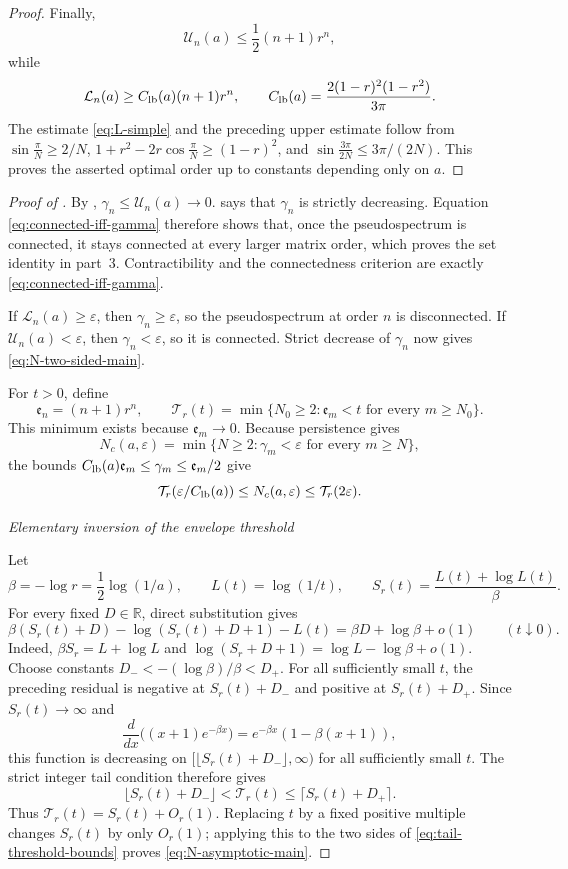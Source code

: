 \documentclass[11pt,a4paper]{article}
\numberwithin{equation}{section}
\newcommand{\proofstage}[1]{%
  \par\medskip\noindent\textit{#1}\par\nobreak\smallskip}
\begin{document}
\begin{proof}
Finally,
\[
 \mathcal U_n(a)\leq\frac12(n+1)r^n,
\]
while
\begin{equation}\label{eq:L-simple}
 \mathcal L_n(a)\geq C_{\rm lb}(a)(n+1)r^n,\qquad
 C_{\rm lb}(a)=\frac{2(1-r)^2(1-r^2)}{3\pi}.
\end{equation}
The estimate \eqref{eq:L-simple} and the preceding upper estimate follow from
\(\sin\frac{\pi}{N}\geq2/N\),
\(1+r^2-2r\cos\frac{\pi}{N}\geq(1-r)^2\), and
\(\sin\frac{3\pi}{2N}\leq3\pi/(2N)\).  This proves the asserted optimal
order up to constants depending only on \(a\).
\end{proof}

\begin{proof}[Proof of ]
By ,
\(\gamma_n\leq\mathcal U_n(a)\to0\).   says that
\(\gamma_n\) is strictly decreasing.  Equation
\eqref{eq:connected-iff-gamma} therefore shows that, once the
pseudospectrum is connected, it stays connected at every larger matrix
order, which proves the set identity in part~3.  Contractibility and the
connectedness criterion are exactly \eqref{eq:connected-iff-gamma}.

If \(\mathcal L_n(a)\geq\varepsilon\), then
\(\gamma_n\geq\varepsilon\), so the pseudospectrum at order \(n\)
is disconnected.  If \(\mathcal U_n(a)<\varepsilon\), then
\(\gamma_n<\varepsilon\), so it is connected.  Strict decrease of
\(\gamma_n\) now gives \eqref{eq:N-two-sided-main}.

For \(t>0\), define
\[
 \mathfrak e_n=(n+1)r^n,\qquad
 \mathcal T_r(t)=\min\{N_0\geq2:\mathfrak e_m<t
 \text{ for every }m\geq N_0\}.
\]
This minimum exists because \(\mathfrak e_m\to0\).
Because persistence gives
\[
 N_c(a,\varepsilon)=
 \min\{N\geq2:\gamma_m<\varepsilon\text{ for every }m\geq N\},
\]
the bounds \(C_{\rm lb}(a)\mathfrak e_m\leq\gamma_m\leq\mathfrak e_m/2\)
give
\begin{equation}\label{eq:tail-threshold-bounds}
 \mathcal T_r(\varepsilon/C_{\rm lb}(a))\leq N_c(a,\varepsilon)
 \leq\mathcal T_r(2\varepsilon).
\end{equation}
\proofstage{Elementary inversion of the envelope threshold}
Let
\[
 \beta=-\log r=\frac12\log(1/a),\qquad
 L(t)=\log(1/t),\qquad
 S_r(t)=\frac{L(t)+\log L(t)}{\beta}.
\]
For every fixed \(D\in\mathbb R\), direct substitution gives
\[
 \beta(S_r(t)+D)-\log(S_r(t)+D+1)-L(t)
 =\beta D+\log\beta+o(1)
 \qquad(t\downarrow0).
\]
Indeed, \(\beta S_r=L+\log L\) and
\(\log(S_r+D+1)=\log L-\log\beta+o(1)\).
Choose constants \(D_-<-(\log\beta)/\beta<D_+\).  For all sufficiently
small \(t\), the preceding residual is negative at \(S_r(t)+D_-\) and
positive at \(S_r(t)+D_+\).  Since \(S_r(t)\to\infty\) and
\[
 \frac{d}{dx}\bigl((x+1)e^{-\beta x}\bigr)
 =e^{-\beta x}(1-\beta(x+1)),
\]
this function is decreasing on
\([\lfloor S_r(t)+D_-\rfloor,\infty)\) for all sufficiently small \(t\).
The strict integer tail condition therefore gives
\[
 \lfloor S_r(t)+D_-\rfloor<\mathcal T_r(t)
 \leq\lceil S_r(t)+D_+\rceil.
\]
Thus \(\mathcal T_r(t)=S_r(t)+O_r(1)\).  Replacing \(t\) by a fixed
positive multiple changes \(S_r(t)\) by only \(O_r(1)\); applying this to
the two sides of \eqref{eq:tail-threshold-bounds} proves
\eqref{eq:N-asymptotic-main}.


\end{proof}
\end{document}
